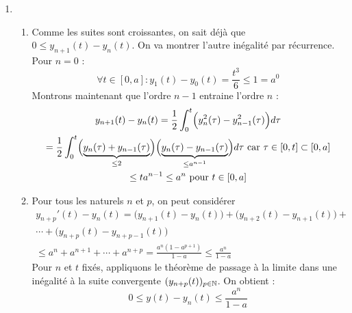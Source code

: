 \begin{enumerate}
\item \begin{enumerate}
 \item Comme les suites sont croissantes, on sait déjà que $0\leq y_{n+1}(t)-y_n(t)$. On va montrer l'autre inégalité par récurrence.\newline
Pour $n=0$ :
\begin{displaymath}
 \forall t\in [0,a] : y_1(t) - y_0(t)=\frac{t^3}{6}\leq 1 = a^0
\end{displaymath}
Montrons maintenant que l'ordre $n-1$ entraine l'ordre $n$ :
\begin{multline*}
 y_{n+1}(t) - y_n(t)
=\frac{1}{2}\int_0^t\Bigl( y_n^2(\tau) - y_{n-1}^2(\tau)\Bigr)d\tau \\
=\frac{1}{2}\int_0^t 
\Bigl( \underset{\leq 2}{\underbrace{y_n(\tau) + y_{n-1}(\tau)}} \Bigr)
\Bigl( \underset{\leq a^{n-1}}{\underbrace{y_n(\tau) - y_{n-1}(\tau)}}\Bigr)
d\tau \text{ car } \tau \in[0,t]\subset [0,a] \\
\leq t a^{n-1} \leq a^n \text{ pour } t\in [0,a]
\end{multline*}

\item Pour tous les naturels $n$ et $p$, on peut considérer
\begin{multline*}
 y_{n+p}'(t) - y_n(t)=
\bigl(y_{n+1}(t) - y_{n}(t)\bigr)+\bigl(y_{n+2}(t) - y_{n+1}(t)\bigr)+ \\\cdots +\bigl(y_{n+p}(t) - y_{n+p-1}(t)\bigr) \\
\leq a^n+a^{n+1}+\cdots+a^{n+p}=\frac{a^n(1-a^{p+1})}{1-a}\leq \frac{a^n}{1-a} 
\end{multline*}
Pour $n$ et $t$ fixés, appliquons le théorème de passage à la limite dans une inégalité à la suite convergente $(y_{n+p}(t))_{p\in \mathbb{N}}$. On obtient :
\begin{displaymath}
 0 \leq y(t) -y_n(t)\leq \frac{a^n}{1-a}
\end{displaymath}


\end{enumerate}
\end{enumerate}
